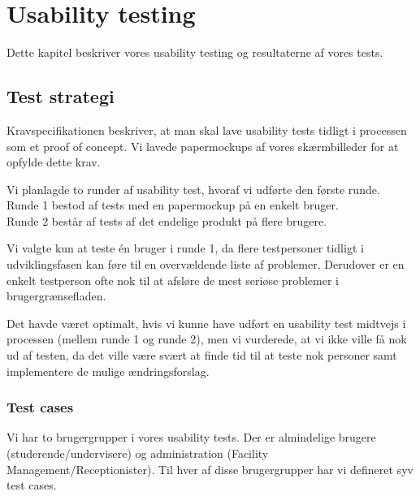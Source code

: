 \chapter{Usability testing}
\label{Usability}
Dette kapitel beskriver vores usability testing og resultaterne af vores tests.

\section{Test strategi}
\label{Usability_TS}
Kravspecifikationen beskriver, at man skal lave usability tests tidligt i processen som et proof of concept. Vi lavede papermockups af vores skærmbilleder for at opfylde dette krav. 

Vi planlagde to runder af usability test, hvoraf vi udførte den første runde.
\\Runde 1 bestod af tests med en papermockup på en enkelt bruger.
\\Runde 2 består af tests af det endelige produkt på flere brugere.

Vi valgte kun at teste én bruger i runde 1, da flere testpersoner tidligt i udviklingsfasen kan føre til en overvældende liste af problemer\cite[s. 416]{SL_UID}. Derudover er en enkelt testperson ofte nok til at afsløre de mest seriøse problemer i brugergrænsefladen.

Det havde været optimalt, hvis vi kunne have udført en usability test midtvejs i processen (mellem runde 1 og runde 2), men vi vurderede, at vi ikke ville få nok ud af testen, da det ville være svært at finde tid til at teste nok personer samt implementere de mulige ændringsforslag.

\subsection{Test cases}
\label{Usability_TS_TC}
Vi har to brugergrupper i vores usability tests. Der er almindelige brugere (studerende/undervisere) og administration (Facility Management/Receptionister). Til hver af disse brugergrupper har vi defineret syv test cases.

